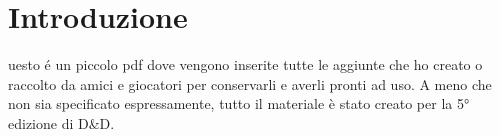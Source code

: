 \chapter{Introduzione}

uesto é un piccolo pdf dove vengono inserite tutte le aggiunte che ho creato o raccolto da amici e giocatori per conservarli e averli pronti ad uso. A meno che non sia specificato espressamente, tutto il materiale è stato creato per la 5° edizione di D&D.

